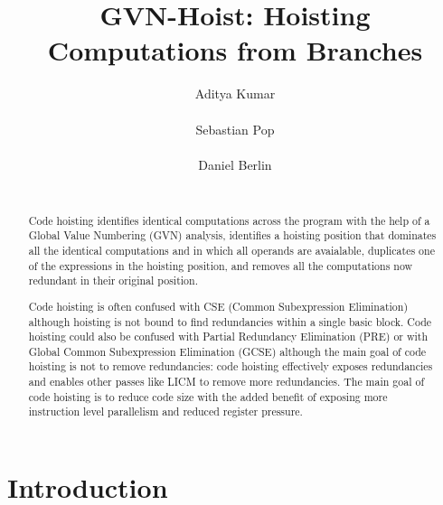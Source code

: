 \documentclass{sig-alternate}
\begin{document}
\def \SCoP {SCoP}
\def \GCC {GCC}
\def \LLVM {LLVM}
\def \SESE {SESE}
\def \CFG {CFG}
\def \SSA {SSA}
\def \scev {scev}

\setlength{\pdfpageheight}{\paperheight}
\setlength{\pdfpagewidth}{\paperwidth}

\title{GVN-Hoist: Hoisting Computations from Branches}


\author{
\alignauthor
Aditya Kumar\\
       \\
\alignauthor
Sebastian Pop\\
       \\
\alignauthor
Daniel Berlin\\
       \\
       \email{}
}

\maketitle
\begin{abstract}
  Code hoisting identifies identical computations across the program with the
  help of a Global Value Numbering (GVN) analysis, identifies a hoisting
  position that dominates all the identical computations and in which all
  operands are avaialable, duplicates one of the expressions in the hoisting
  position, and removes all the computations now redundant in their original
  position.

  Code hoisting is often confused with CSE (Common Subexpression Elimination)
  although hoisting is not bound to find redundancies within a single basic
  block.  Code hoisting could also be confused with Partial Redundancy
  Elimination (PRE) or with Global Common Subexpression Elimination (GCSE)
  although the main goal of code hoisting is not to remove redundancies: code
  hoisting effectively exposes redundancies and enables other passes like LICM
  to remove more redundancies.  The main goal of code hoisting is to reduce code
  size with the added benefit of exposing more instruction level parallelism and
  reduced register pressure.
\end{abstract}

\section{Introduction}
\end{document}
